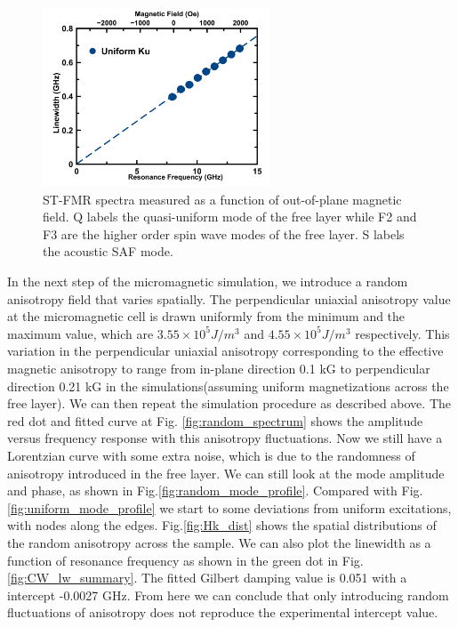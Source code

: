 \begin{figure}[h]
  \includegraphics[width=0.6\textwidth]{fig/CW_sim/uniform_LW.png}
  \centering
  \caption{ST-FMR spectra measured as a function of out-of-plane magnetic field. Q labels the quasi-uniform mode of the free layer while F2 and F3 are the higher order spin wave modes of the free layer. S labels the acoustic SAF mode. }
  \label{fig:uniform_lw}
\end{figure}

In the next step of the micromagnetic simulation, we introduce a random anisotropy field that varies spatially. The perpendicular uniaxial anisotropy value at the micromagnetic cell is drawn uniformly from the minimum and the maximum value, which are $3.55 \times 10^5 J/ m^3 $ and  $4.55 \times 10^5 J/ m^3 $ respectively. This variation in the perpendicular uniaxial anisotropy corresponding to the effective magnetic anisotropy to range from in-plane direction 0.1 kG to perpendicular direction 0.21 kG in the simulations(assuming uniform magnetizations across the free layer). We can then repeat the simulation procedure as described above. The red dot and fitted curve at Fig. \ref{fig:random_spectrum} shows the amplitude versus frequency response with this anisotropy fluctuations. Now we still have a Lorentzian curve with some extra noise, which is due to the randomness of anisotropy introduced in the free layer. We can still look at the mode amplitude and phase, as shown in Fig.\ref{fig:random_mode_profile}. Compared with Fig.\ref{fig:uniform_mode_profile} we start to some deviations from uniform excitations, with nodes along the edges. Fig.\ref{fig:Hk_dist} shows the spatial distributions of the random anisotropy across the sample. We can also plot the linewidth as a function of resonance frequency as shown in the green dot in Fig.\ref{fig:CW_lw_summary}. The fitted Gilbert damping value is 0.051 with a intercept -0.0027 GHz. From here we can conclude that only introducing random fluctuations of anisotropy does not reproduce the experimental intercept value.




